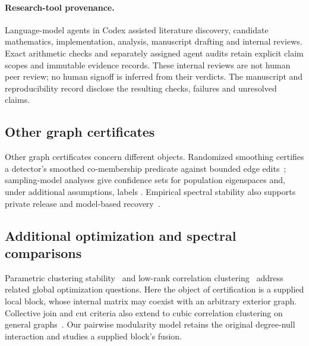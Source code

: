 \documentclass[sigconf,anonymous,review]{acmart}
\newcommand{\1}{\mathbf{1}}
\begin{document}
\paragraph{Research-tool provenance.}
Language-model agents in Codex assisted literature discovery, candidate
mathematics, implementation, analysis, manuscript drafting and internal reviews.
Exact arithmetic checks and separately assigned agent audits retain explicit
claim scopes and immutable evidence records. These internal reviews are not
human peer review; no human signoff is inferred from their verdicts.
The manuscript and reproducibility record disclose the resulting checks,
failures and unresolved claims.

\subsection{Other graph certificates}
Other graph certificates concern different objects. Randomized smoothing
certifies a detector's smoothed co-membership predicate against bounded edge
edits~\cite{jia2020certified}; sampling-model analyses give confidence sets for
population eigenspaces and, under additional assumptions, labels
\cite{gokavarapu2026finite}. Empirical spectral stability also supports private
release and model-based recovery~\cite{wang2026netptr}.

\subsection{Additional optimization and spectral comparisons}
Parametric clustering stability~\cite{nowozin2009solution} and low-rank correlation
clustering~\cite{veldt2017correlation} address related global optimization questions. Here the object of
certification is a supplied local block, whose internal matrix may coexist with
an arbitrary exterior graph.
Collective join and cut criteria also extend to cubic correlation clustering on
general graphs~\cite{stein2025partial}. Our pairwise modularity model retains
the original degree-null interaction and studies a supplied block's fusion.
\end{document}

